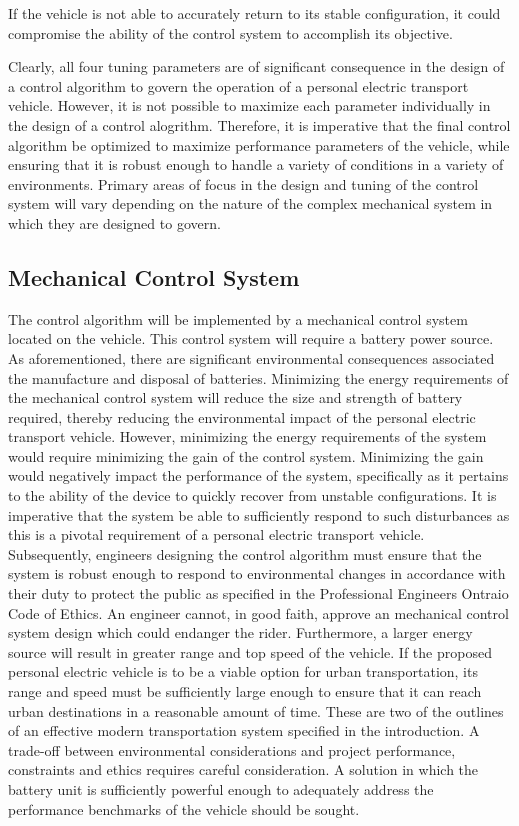 If the vehicle is not able to accurately return to its stable configuration, it could compromise the ability of the control system to accomplish its objective.
\par
Clearly, all four tuning parameters are of significant consequence in the design of a control algorithm to govern the operation of a personal electric transport vehicle. 
However, it is not possible to maximize each parameter individually in the design of a control alogrithm. 
Therefore, it is imperative that the final control algorithm be optimized to maximize performance parameters of the vehicle, while ensuring that it is robust enough to handle a variety of conditions in a variety of environments. 
Primary areas of focus in the design and tuning of the control system will vary depending on the nature of the complex mechanical system in which they are designed to govern.

\subsection{Mechanical Control System}
The control algorithm will be implemented by a mechanical control system located on the vehicle. 
This control system will require a battery power source.
As aforementioned, there are significant environmental consequences associated the manufacture and disposal of batteries. 
Minimizing the energy requirements of the mechanical control system will reduce the size and strength of battery required, thereby reducing the environmental impact of the personal electric transport vehicle.  
However, minimizing the energy requirements of the system would require minimizing the gain of the control system. 
Minimizing the gain would negatively impact the performance of the system, specifically as it pertains to the ability of the device to quickly recover from unstable configurations. 
It is imperative that the system be able to sufficiently respond to such disturbances as this is a pivotal requirement of a personal electric transport vehicle. 
Subsequently, engineers designing the control algorithm must ensure that the system is robust enough to respond to environmental changes in accordance with their duty to protect the public as specified in the Professional Engineers Ontraio Code of Ethics. 
An engineer cannot, in good faith, approve an mechanical control system design which could endanger the rider. 
Furthermore, a larger energy source will result in greater range and top speed of the vehicle. 
If the proposed personal electric vehicle is to be a viable option for urban transportation, its range and speed must be sufficiently large enough to ensure that it can reach urban destinations in a reasonable amount of time.
These are two of the outlines of an effective modern transportation system specified in the introduction. 
A trade-off between environmental considerations and project performance, constraints and ethics requires careful consideration. 
A solution in which the battery unit is sufficiently powerful enough to adequately address the performance benchmarks of the vehicle should be sought. 